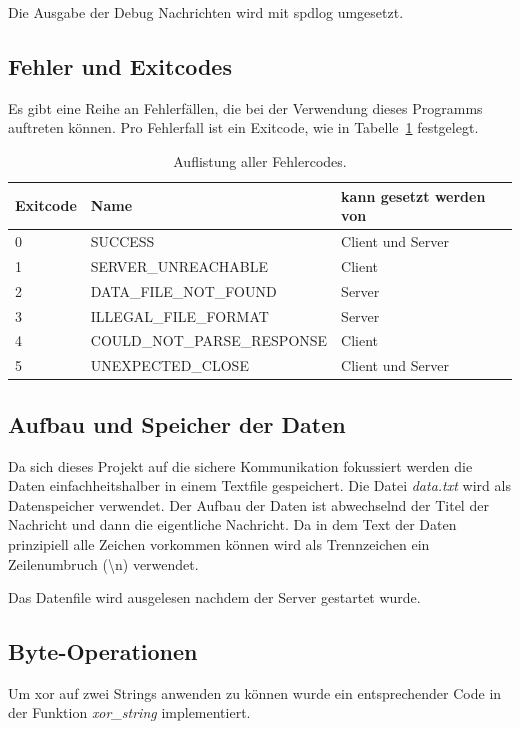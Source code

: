 \documentclass[]{article}
\begin{document}
Die Ausgabe der Debug Nachrichten wird mit spdlog umgesetzt.

\subsection{Fehler und Exitcodes}
Es gibt eine Reihe an Fehlerfällen, die bei der Verwendung dieses Programms auftreten können. Pro Fehlerfall ist ein Exitcode, wie in Tabelle~\ref{tab:exit_codes} festgelegt.

\begin{table}[]
	\centering
	\begin{tabular}{|l|l|l|}
		\hline
		\textbf{Exitcode} & \textbf{Name} & \textbf{kann gesetzt werden von} \\ \hline
		0          & SUCCESS                & Client und Server     \\ \hline
		1          & SERVER\_UNREACHABLE    & Client                \\ \hline
		2          & DATA\_FILE\_NOT\_FOUND & Server                \\ \hline
		3          & ILLEGAL\_FILE\_FORMAT     & Server                \\ \hline
		4          & COULD\_NOT\_PARSE\_RESPONSE      & Client                \\ \hline
		5          & UNEXPECTED\_CLOSE      & Client und Server     \\ \hline
	\end{tabular}
	\caption{Auflistung aller Fehlercodes.}
	\label{tab:exit_codes}
\end{table}

\subsection{Aufbau und Speicher der Daten}
Da sich dieses Projekt auf die sichere Kommunikation fokussiert werden die Daten einfachheitshalber in einem Textfile gespeichert. Die Datei \textit{data.txt} wird als Datenspeicher verwendet. Der Aufbau der Daten ist abwechselnd der Titel der Nachricht und dann die eigentliche Nachricht. Da in dem Text der Daten prinzipiell alle Zeichen vorkommen können wird als Trennzeichen ein Zeilenumbruch (\textbackslash n) verwendet.

Das Datenfile wird ausgelesen nachdem der Server gestartet wurde.

\subsection{Byte-Operationen}
\label{sec:byte_operationen}
Um xor auf zwei Strings anwenden zu können wurde ein entsprechender Code in der Funktion \textit{xor\_string} implementiert.
\end{document}
